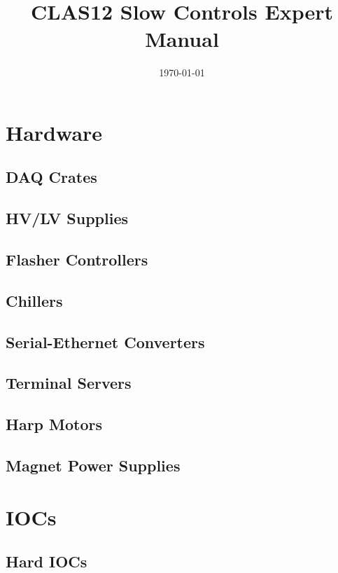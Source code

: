 \documentclass[amsmath,amssymb,notitlepage,11pt]{revtex4}
\begin{document}
\title{CLAS12 Slow Controls Expert Manual}
\date{\today}
\begin{abstract}
\end{abstract}

\maketitle
\tableofcontents
\newpage

\section{Hardware}
\subsection{DAQ Crates}
\subsection{HV/LV Supplies}
\subsection{Flasher Controllers}
\subsection{Chillers}
\subsection{Serial-Ethernet Converters}
\subsection{Terminal Servers}
\subsection{Harp Motors}
\subsection{Magnet Power Supplies}

\section{IOCs}
\subsection{Hard IOCs}
\end{document}

